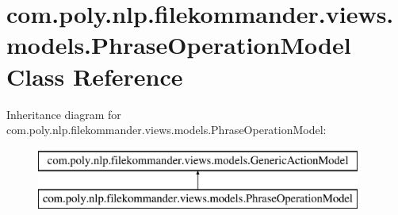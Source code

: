 \hypertarget{classcom_1_1poly_1_1nlp_1_1filekommander_1_1views_1_1models_1_1_phrase_operation_model}{\section{com.\-poly.\-nlp.\-filekommander.\-views.\-models.\-Phrase\-Operation\-Model Class Reference}
\label{classcom_1_1poly_1_1nlp_1_1filekommander_1_1views_1_1models_1_1_phrase_operation_model}
}
Inheritance diagram for com.\-poly.\-nlp.\-filekommander.\-views.\-models.\-Phrase\-Operation\-Model\-:\begin{figure}[H]
\begin{center}
\leavevmode
\includegraphics[height=2.000000cm]{classcom_1_1poly_1_1nlp_1_1filekommander_1_1views_1_1models_1_1_phrase_operation_model}
\end{center}
\end{figure}
